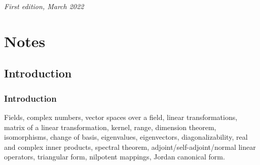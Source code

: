 \documentclass[11pt,fleqn]{book} %
\begin{document}
\noindent \textit{First edition, March 2022} %




\pagestyle{empty} %

\tableofcontents %

\cleardoublepage %

\pagestyle{fancy} %


\part{Notes}



\setcounter{chapter}{-1}
\chapter{Introduction}

\section{Introduction}

Fields, complex numbers, vector spaces over a field, linear transformations, matrix of a linear transformation, kernel, range, dimension theorem, isomorphisms, change of basis, eigenvalues, eigenvectors, diagonalizability, real and complex inner products, spectral theorem, adjoint/self-adjoint/normal linear operators, triangular form, nilpotent mappings, Jordan canonical form.
\end{document}
